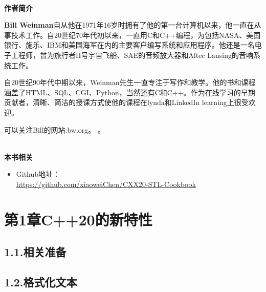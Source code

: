 \documentclass[11pt,a4paper,UTF8]{book}
\begin{document}
\begin{sloppypar}
	\hspace*{\fill} \\ %
	\noindent\textbf{作者简介}
	
	\textbf{Bill Weinman}自从他在1971年16岁时拥有了他的第一台计算机以来，他一直在从事技术工作。自20世纪70年代初以来，一直用C和C++编程，为包括NASA、美国银行、施乐、IBM和美国海军在内的主要客户编写系统和应用程序。他还是一名电子工程师，曾为旅行者II号宇宙飞船、SAE的音频放大器和Altec Lansing的音响系统工作。
	
	自20世纪90年代中期以来，Weinman先生一直专注于写作和教学。他的书和课程涵盖了HTML、SQL、CGI、Python，当然还有C和C++。作为在线学习的早期贡献者，清晰、简洁的授课方式使他的课程在lynda和LinkedIn learning上很受欢迎。
	
	可以关注Bill的网站:bw.org。
	。
	
	\hspace*{\fill} \\ %
	\noindent\textbf{本书相关}
	\begin{itemize}
		\item Github地址：\\\url{https://github.com/xiaoweiChen/CXX20-STL-Cookbook}
	\end{itemize}
	\newpage
	
	\pagestyle{empty}
	
	\newpage
	
	\tableofcontents
	\newpage


	\section*{ 第1章\hspace{0.5cm}C++20的新特性}
	
	
	\subsection*{ 1.1.\hspace{0.2cm}相关准备}
	
	
	\subsection*{ 1.2.\hspace{0.2cm}格式化文本}
	
	

\end{sloppypar}
\end{document}
